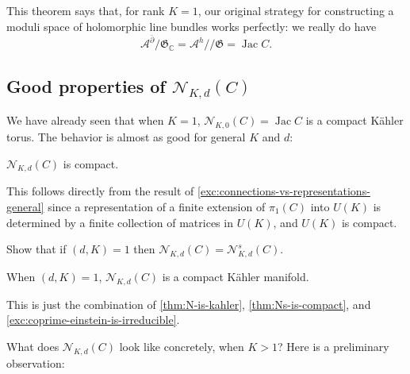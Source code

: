 \documentclass[12pt,letterpaper,reqno]{article}
\numberwithin{equation}{section}
\newcommand{\fG}{{\mathfrak G}}
\newcommand{\cN}{\ensuremath{\mathcal N}}
\newcommand{\cA}{\ensuremath{\mathcal A}}
\newcommand{\C}{\ensuremath{\mathbb C}}
\newcommand{\kahler}{K\"ahler\xspace}
\newcommand{\kq}{/\!\!/}
\DeclareMathOperator{\Jac}{Jac}
\begin{document}
This theorem says that, for rank $K=1$, our original strategy
for constructing a moduli space of holomorphic line bundles
works perfectly: we really do have
\begin{equation}
  \cA^{\bar\partial} / \fG_\C = \cA^h \kq \fG = \Jac C.
\end{equation}


\subsection{Good properties of $\cN_{K,d}(C)$}

We have already seen that when $K=1$, $\cN_{K,0}(C) = \Jac C$ is a compact
\kahler torus. The behavior is almost as good
for general $K$ and $d$:

\begin{cor}[Compactness of $\cN_{K,d}(C)$] \label{thm:Ns-is-compact}
$\cN_{K,d}(C)$ is compact.
\end{cor}
\begin{pf} This follows directly from the result of 
\autoref{exc:connections-vs-representations-general}
since a representation of a finite extension of $\pi_1(C)$ into 
$U(K)$ is determined by a finite collection of matrices in $U(K)$,
and $U(K)$ is compact.
\end{pf}

\begin{exercise} \label{exc:coprime-einstein-is-irreducible} 
Show that if $(d,K)=1$ then $\cN_{K,d}(C) = \cN_{K,d}^s(C)$. 
\end{exercise}

\begin{cor}[$\cN_{K,d}(C)$ is nice when $(d,K)$ = 1]
When $(d,K) = 1$, $\cN_{K,d}(C)$ is a compact
\kahler manifold.
\end{cor}
\begin{pf} This is just the combination of \autoref{thm:N-is-kahler},
\autoref{thm:Ns-is-compact}, and 
\autoref{exc:coprime-einstein-is-irreducible}.
\end{pf}

What does $\cN_{K,d}(C)$ look like concretely, when $K>1$? Here is a 
preliminary observation:
\end{document}
